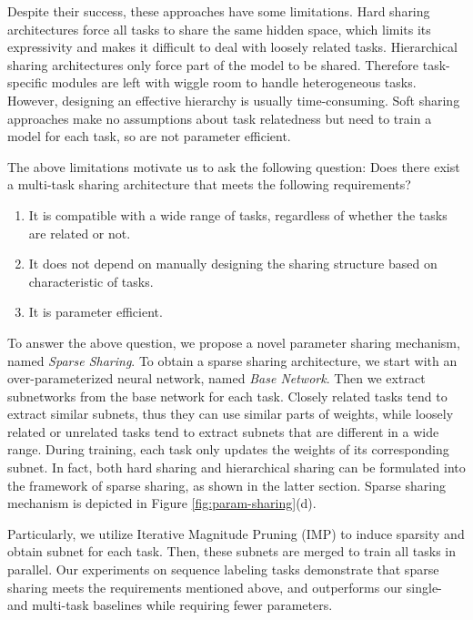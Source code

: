 \documentclass[letterpaper]{article} %
\begin{document}
Despite their success, these approaches have some limitations. Hard sharing architectures force all tasks to share the same hidden space, which limits its expressivity and makes it difficult to deal with loosely related tasks. Hierarchical sharing architectures only force part of the model to be shared. Therefore task-specific modules are left with wiggle room to handle heterogeneous tasks. However, designing an effective hierarchy is usually time-consuming. Soft sharing approaches make no assumptions about task relatedness but need to train a model for each task, so are not parameter efficient.

The above limitations motivate us to ask the following question: Does there exist a multi-task sharing architecture that meets the following requirements?
\begin{enumerate}
    \item It is compatible with a wide range of tasks, regardless of whether the tasks are related or not.
    \item It does not depend on manually designing the sharing structure based on characteristic of tasks.
    \item It is parameter efficient.
\end{enumerate}

To answer the above question, we propose a novel parameter sharing mechanism, named \emph{Sparse Sharing}. To obtain a sparse sharing architecture, we start with an over-parameterized neural network, named \emph{Base Network}. Then we extract subnetworks from the base network for each task. Closely related tasks tend to extract similar subnets, thus they can use similar parts of weights, while loosely related or unrelated tasks tend to extract subnets that are different in a wide range. During training, each task only updates the weights of its corresponding subnet. In fact, both hard sharing and hierarchical sharing can be formulated into the framework of sparse sharing, as shown in the latter section. Sparse sharing mechanism is depicted in Figure \ref{fig:param-sharing}(d).

Particularly, we utilize Iterative Magnitude Pruning (IMP) \cite{DBLP:conf/iclr/FrankleC19} to induce sparsity and obtain subnet for each task. Then, these subnets are merged to train all tasks in parallel. Our experiments on sequence labeling tasks demonstrate that sparse sharing meets the requirements mentioned above, and outperforms our single- and multi-task baselines while requiring fewer parameters.
\end{document}
